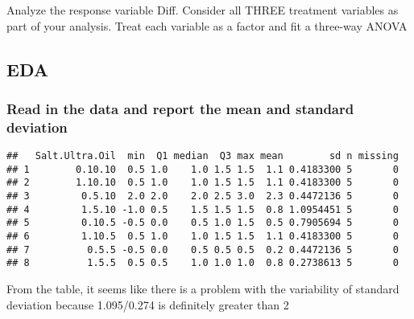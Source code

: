 \documentclass[]{article}
\newenvironment{Shaded}{\begin{snugshade}}{\end{snugshade}}
\newcommand{\DataTypeTok}[1]{\textcolor[rgb]{0.13,0.29,0.53}{#1}}
\newcommand{\KeywordTok}[1]{\textcolor[rgb]{0.13,0.29,0.53}{\textbf{#1}}}
\newcommand{\NormalTok}[1]{#1}
\newcommand{\OperatorTok}[1]{\textcolor[rgb]{0.81,0.36,0.00}{\textbf{#1}}}
\newcommand{\StringTok}[1]{\textcolor[rgb]{0.31,0.60,0.02}{#1}}
\begin{document}
Analyze the response variable Diff. Consider all THREE treatment
variables as part of your analysis. Treat each variable as a factor and
fit a three-way ANOVA

\hypertarget{eda-2}{%
\subsection{EDA}\label{eda-2}}

\hypertarget{read-in-the-data-and-report-the-mean-and-standard-deviation-2}{%
\subsubsection{Read in the data and report the mean and standard
deviation}\label{read-in-the-data-and-report-the-mean-and-standard-deviation-2}}

\begin{Shaded}
\end{Shaded}

\begin{verbatim}
##   Salt.Ultra.Oil  min  Q1 median  Q3 max mean        sd n missing
## 1        0.10.10  0.5 1.0    1.0 1.5 1.5  1.1 0.4183300 5       0
## 2        1.10.10  0.5 1.0    1.0 1.5 1.5  1.1 0.4183300 5       0
## 3         0.5.10  2.0 2.0    2.0 2.5 3.0  2.3 0.4472136 5       0
## 4         1.5.10 -1.0 0.5    1.5 1.5 1.5  0.8 1.0954451 5       0
## 5         0.10.5 -0.5 0.0    0.5 1.0 1.5  0.5 0.7905694 5       0
## 6         1.10.5  0.5 1.0    1.0 1.5 1.5  1.1 0.4183300 5       0
## 7          0.5.5 -0.5 0.0    0.5 0.5 0.5  0.2 0.4472136 5       0
## 8          1.5.5  0.5 0.5    1.0 1.0 1.0  0.8 0.2738613 5       0
\end{verbatim}

From the table, it seems like there is a problem with the variability of
standard deviation because 1.095/0.274 is definitely greater than 2
\end{document}

